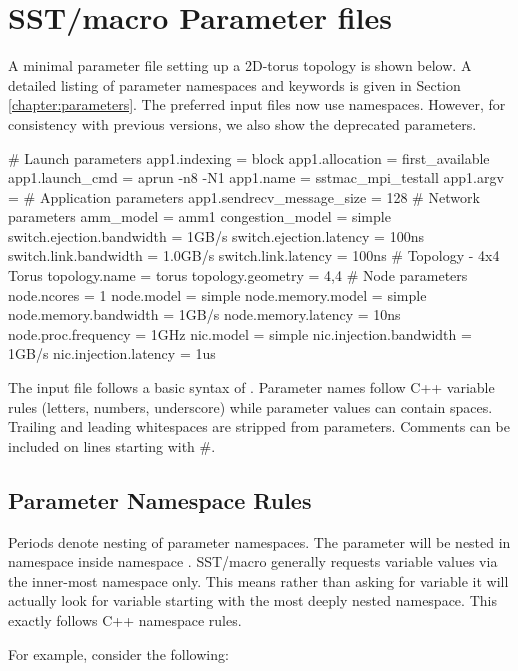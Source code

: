 
\section{SST/macro Parameter files}
\label{sec:parameters}
A minimal parameter file setting up a 2D-torus topology is shown below. 
A detailed listing of parameter namespaces and keywords is given in Section \ref{chapter:parameters}.
The preferred input files now use namespaces.
However, for consistency with previous versions, we also show the deprecated parameters.

\begin{ViFile}
# Launch parameters
app1.indexing = block
app1.allocation = first_available
app1.launch_cmd = aprun -n8 -N1
app1.name = sstmac_mpi_testall
app1.argv =
# Application parameters
app1.sendrecv_message_size = 128
# Network parameters
amm_model = amm1
congestion_model = simple
switch.ejection.bandwidth = 1GB/s
switch.ejection.latency = 100ns
switch.link.bandwidth = 1.0GB/s
switch.link.latency = 100ns
# Topology - 4x4 Torus
topology.name = torus
topology.geometry = 4,4
# Node parameters
node.ncores = 1
node.model = simple
node.memory.model = simple
node.memory.bandwidth = 1GB/s
node.memory.latency = 10ns
node.proc.frequency = 1GHz
nic.model = simple
nic.injection.bandwidth = 1GB/s
nic.injection.latency = 1us
\end{ViFile}
The input file follows a basic syntax of .  
Parameter names follow C++ variable rules (letters, numbers, underscore) while parameter values can contain spaces.  Trailing and leading whitespaces are stripped from parameters.
Comments can be included on lines starting with \#.

\subsection{Parameter Namespace Rules}
Periods denote nesting of parameter namespaces.
The parameter  will be nested in namespace  inside namespace .
SST/macro generally requests variable values via the inner-most namespace only.
This means rather than asking for variable  it will actually look for variable  starting with the most deeply nested namespace.
This exactly follows C++ namespace rules.

For example, consider the following:

